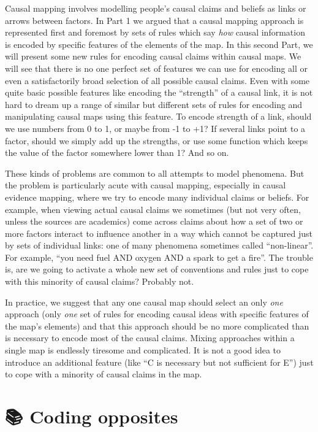 \documentclass[
]{book}
\begin{document}
Causal mapping involves modelling people's causal claims and beliefs as links or arrows between factors. In Part 1 we argued that a causal mapping approach is represented first and foremost by sets of rules which say \emph{how} causal information is encoded by specific features of the elements of the map. In this second Part, we will present some new rules for encoding causal claims within causal maps. We will see that there is no one perfect set of features we can use for encoding all or even a satisfactorily broad selection of all possible causal claims. Even with some quite basic possible features like encoding the ``strength'' of a causal link, it is not hard to dream up a range of similar but different sets of rules for encoding and manipulating causal maps using this feature. To encode strength of a link, should we use numbers from 0 to 1, or maybe from -1 to +1? If several links point to a factor, should we simply add up the strengths, or use some function which keeps the value of the factor somewhere lower than 1? And so on.

These kinds of problems are common to all attempts to model phenomena. But the problem is particularly acute with causal mapping, especially in causal evidence mapping, where we try to encode many individual claims or beliefs. For example, when viewing actual causal claims we sometimes (but not very often, unless the sources are academics) come across claims about how a set of two or more factors interact to influence another in a way which cannot be captured just by sets of individual links: one of many phenomena sometimes called ``non-linear''. For example, ``you need fuel AND oxygen AND a spark to get a fire''. The trouble is, are we going to activate a whole new set of conventions and rules just to cope with this minority of causal claims? Probably not.

In practice, we suggest that any one causal map should select an only \emph{one} approach (only \emph{one} set of rules for encoding causal ideas with specific features of the map's elements) and that this approach should be no more complicated than is necessary to encode most of the causal claims. Mixing approaches within a single map is endlessly tiresome and complicated. It is not a good idea to introduce an additional feature (like ``C is necessary but not sufficient for E'') just to cope with a minority of causal claims in the map.

\hypertarget{coding-opposites}{%
\chapter{📚 Coding opposites}\label{coding-opposites}}
\end{document}
